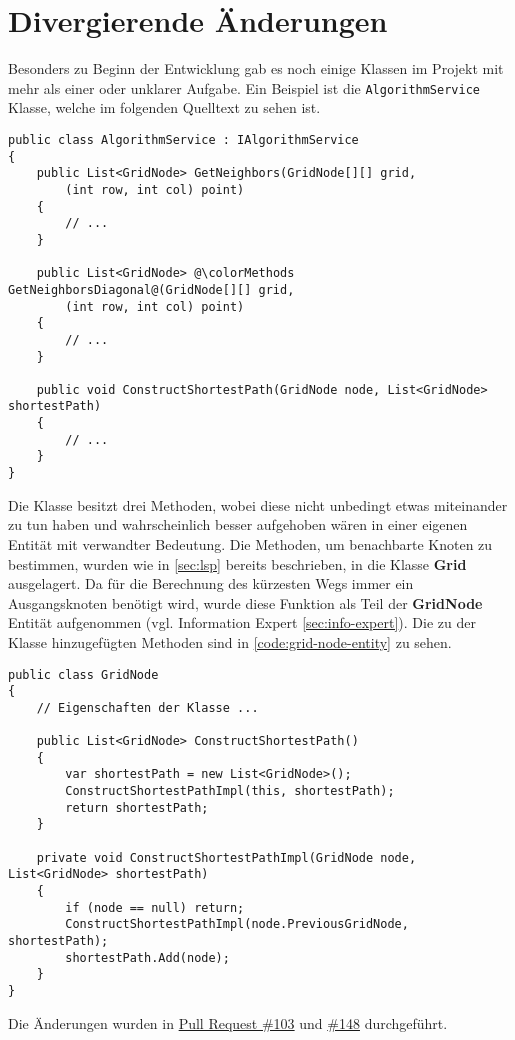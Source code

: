 \section{Divergierende Änderungen}
Besonders zu Beginn der Entwicklung gab es noch einige Klassen
im Projekt mit mehr als einer oder unklarer Aufgabe.
Ein Beispiel ist die \lstinline{AlgorithmService} Klasse,
welche im folgenden Quelltext zu sehen ist.
\begin{lstlisting}[caption={{\lstinline{AlgorithmService}} Klasse},
    label={code:alg-service}]
public class AlgorithmService : IAlgorithmService
{
    public List<GridNode> GetNeighbors(GridNode[][] grid,
        (int row, int col) point)
    {
        // ...
    }

    public List<GridNode> @\colorMethods GetNeighborsDiagonal@(GridNode[][] grid,
        (int row, int col) point)
    {
        // ...
    }

    public void ConstructShortestPath(GridNode node, List<GridNode> shortestPath)
    {
        // ...
    }
}
\end{lstlisting}
Die Klasse besitzt drei Methoden, wobei diese nicht unbedingt etwas miteinander
zu tun haben und wahrscheinlich besser aufgehoben
wären in einer eigenen Entität mit verwandter Bedeutung. Die Methoden,
um benachbarte Knoten zu bestimmen, wurden wie in \autoref{sec:lsp}
bereits beschrieben, in die Klasse \textbf{Grid} ausgelagert.
Da für die Berechnung des kürzesten Wegs immer ein Ausgangsknoten benötigt wird, wurde diese
Funktion als Teil der \textbf{GridNode}
Entität aufgenommen (vgl. Information Expert \ref{sec:info-expert}).
Die zu der Klasse hinzugefügten Methoden sind in \autoref{code:grid-node-entity} zu sehen.
\begin{lstlisting}[caption={\textbf{GridNode} Entität}, label={code:grid-node-entity}]
public class GridNode
{
    // Eigenschaften der Klasse ...

    public List<GridNode> ConstructShortestPath()
    {
        var shortestPath = new List<GridNode>();
        ConstructShortestPathImpl(this, shortestPath);
        return shortestPath;
    }

    private void ConstructShortestPathImpl(GridNode node, List<GridNode> shortestPath)
    {
        if (node == null) return;
        ConstructShortestPathImpl(node.PreviousGridNode, shortestPath);
        shortestPath.Add(node);
    }
}
\end{lstlisting}
Die Änderungen wurden in
\href{https://github.com/JensDll/pathfinding-visualization/pull/103}{Pull Request \#103}
und \href{https://github.com/JensDll/pathfinding-visualization/pull/148}{\#148}
durchgeführt.